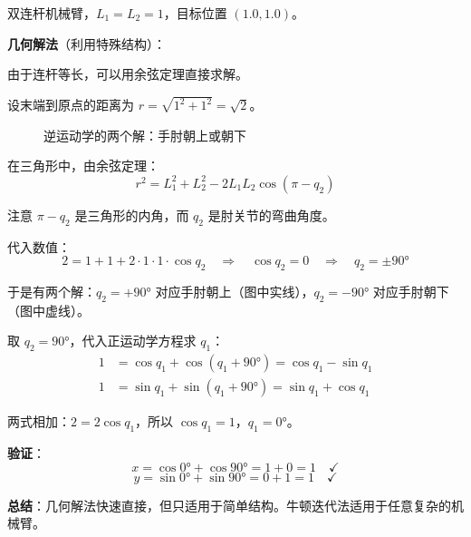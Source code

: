 \begin{example}
双连杆机械臂，$L_1 = L_2 = 1$，目标位置 $(1.0, 1.0)$。

\textbf{几何解法}（利用特殊结构）：

由于连杆等长，可以用余弦定理直接求解。

设末端到原点的距离为 $r = \sqrt{1^2 + 1^2} = \sqrt{2}$。

\begin{figure}[htbp]
\centering
{}
\caption{逆运动学的两个解：手肘朝上或朝下}
\end{figure}

在三角形中，由余弦定理：
\[
r^2 = L_1^2 + L_2^2 - 2L_1 L_2 \cos(\pi - q_2)
\]

注意 $\pi - q_2$ 是三角形的内角，而 $q_2$ 是肘关节的弯曲角度。

代入数值：
\[
2 = 1 + 1 + 2 \cdot 1 \cdot 1 \cdot \cos q_2 \quad \Rightarrow \quad \cos q_2 = 0 \quad \Rightarrow \quad q_2 = \pm 90°
\]

于是有两个解：$q_2 = +90°$ 对应手肘朝上（图中实线），$q_2 = -90°$ 对应手肘朝下（图中虚线）。

取 $q_2 = 90°$，代入正运动学方程求 $q_1$：
\begin{align}
1 &= \cos q_1 + \cos(q_1 + 90°) = \cos q_1 - \sin q_1 \\
1 &= \sin q_1 + \sin(q_1 + 90°) = \sin q_1 + \cos q_1
\end{align}

两式相加：$2 = 2\cos q_1$，所以 $\cos q_1 = 1$，$q_1 = 0°$。

\textbf{验证}：
\[
x = \cos 0° + \cos 90° = 1 + 0 = 1 \quad \checkmark
\]
\[
y = \sin 0° + \sin 90° = 0 + 1 = 1 \quad \checkmark
\]

\textbf{总结}：几何解法快速直接，但只适用于简单结构。牛顿迭代法适用于任意复杂的机械臂。
\end{example}

